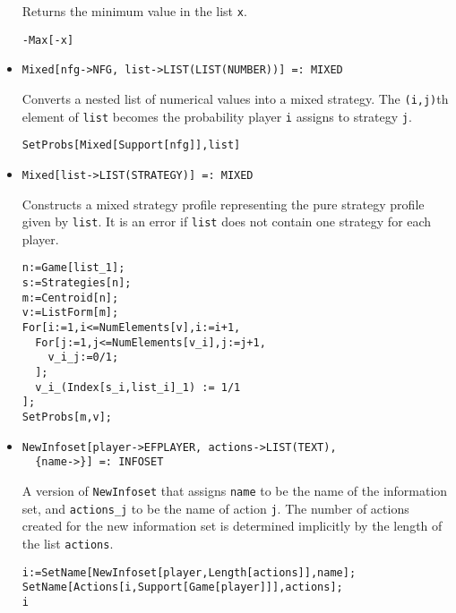 \begin{itemize}
\bd 
Returns the minimum value in the list \verb+x+.  
\begin{verbatim}
-Max[-x]
\end{verbatim} 
\ed

\item{}
\protect \large \begin{verbatim}
Mixed[nfg->NFG, list->LIST(LIST(NUMBER))] =: MIXED 
\end{verbatim}\normalsize

\bd 
Converts a nested list of numerical values into a mixed strategy.  The
\verb+(i,j)+th element of \verb+list+ becomes the probability
player \verb+i+ assigns to strategy \verb+j+. 
\begin{verbatim}
SetProbs[Mixed[Support[nfg]],list]
\end{verbatim} 
\ed

\item{}
\protect \large \begin{verbatim}
Mixed[list->LIST(STRATEGY)] =: MIXED 
\end{verbatim}\normalsize

\bd 
Constructs a mixed strategy profile representing the pure strategy
profile given by \verb+list+. It is an error if \verb+list+ does not
contain one strategy for each player.
\begin{verbatim}
n:=Game[list_1];
s:=Strategies[n];
m:=Centroid[n];
v:=ListForm[m];
For[i:=1,i<=NumElements[v],i:=i+1,
  For[j:=1,j<=NumElements[v_i],j:=j+1,
    v_i_j:=0/1;
  ];
  v_i_(Index[s_i,list_i]_1) := 1/1
];
SetProbs[m,v];   
\end{verbatim} 
\ed



\item{}
\protect \large \begin{verbatim}
NewInfoset[player->EFPLAYER, actions->LIST(TEXT), 
  {name->}] =: INFOSET 
\end{verbatim}\normalsize

\bd 
A version of \verb+NewInfoset+ that assigns \verb+name+ to be the name
of the information set, and \verb+actions_j+ to be the name of action
\verb+j+.  The number of actions created for the new information set
is determined implicitly by the length of the list \verb+actions+.  
\begin{verbatim}
i:=SetName[NewInfoset[player,Length[actions]],name];
SetName[Actions[i,Support[Game[player]]],actions];
i
\end{verbatim} 
\ed


\end{itemize}
